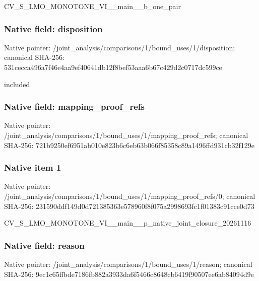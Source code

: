 \documentclass[10pt,a4paper]{article}
\begin{document}
\begingroup\raggedright\sloppy CV\_\allowbreak{}S\_\allowbreak{}LMO\_\allowbreak{}MONOTONE\_\allowbreak{}VI\_\allowbreak{}\_\allowbreak{}main\_\allowbreak{}\_\allowbreak{}b\_\allowbreak{}one\_\allowbreak{}pair\par\endgroup

\subsubsection{Native field: disposition}
Native pointer: /joint\_\allowbreak{}analysis/comparisons/1/bound\_\allowbreak{}uses/1/disposition; canonical SHA-256: 531cecca496a7f46e4aa9ef40641db12f8bef53aaa6b67c429d2c0717dc599ce

\begingroup\raggedright\sloppy included\par\endgroup

\subsubsection{Native field: mapping\_\allowbreak{}proof\_\allowbreak{}refs}
Native pointer: /joint\_\allowbreak{}analysis/comparisons/1/bound\_\allowbreak{}uses/1/mapping\_\allowbreak{}proof\_\allowbreak{}refs; canonical SHA-256: 721b9250ef6951ab010e823b6c6eb63b066f85358c89a1496ffd931cb32f129e

\subsubsection{Native item 1}
Native pointer: /joint\_\allowbreak{}analysis/comparisons/1/bound\_\allowbreak{}uses/1/mapping\_\allowbreak{}proof\_\allowbreak{}refs/0; canonical SHA-256: 231590ddf149d0d721385363e578960f8f075a2998693fc1f01383c91cce0d73

\begingroup\raggedright\sloppy CV\_\allowbreak{}S\_\allowbreak{}LMO\_\allowbreak{}MONOTONE\_\allowbreak{}VI\_\allowbreak{}\_\allowbreak{}main\_\allowbreak{}\_\allowbreak{}p\_\allowbreak{}native\_\allowbreak{}joint\_\allowbreak{}closure\_\allowbreak{}20261116\par\endgroup

\subsubsection{Native field: reason}
Native pointer: /joint\_\allowbreak{}analysis/comparisons/1/bound\_\allowbreak{}uses/1/reason; canonical SHA-256: 9ec1c65ffbde7186fb882a3933da6f5466c8648cb6419f90507ee6ab84094d9e
\end{document}
